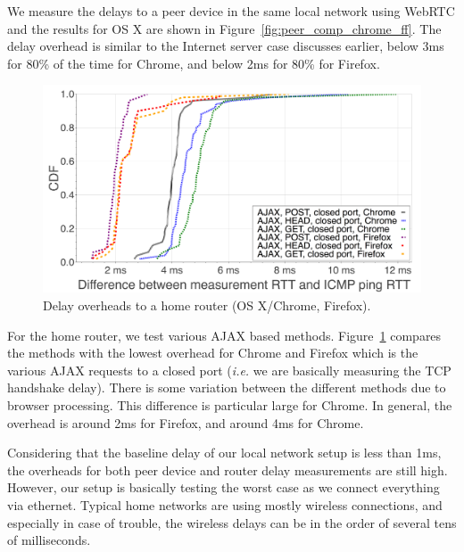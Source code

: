 \documentclass[12pt,twoside]{book}
\begin{document}
We measure the delays to a peer device in the same local network using WebRTC and the results for OS X are shown in Figure~\ref{fig:peer_comp_chrome_ff}. The delay overhead is similar to the Internet server case discusses earlier, below 3ms for 80\% of the time for Chrome, and below 2ms for 80\% for Firefox. 

\begin{figure}[thb]
\includegraphics[width=\columnwidth]{figures/router-comp-chrome-ff}
\caption{Delay overheads to a home router (OS X/Chrome, Firefox).}
\label{fig:router_comp_chrome_ff}
\end{figure}

For the home router, we test various AJAX based methods. Figure~\ref{fig:router_comp_chrome_ff} compares the methods with the lowest overhead for Chrome and Firefox which is the various AJAX requests to a closed port (\emph{i.e.} we are basically measuring the TCP handshake delay). There is some variation between the different methods due to browser processing. This difference is particular large for Chrome. In general, the overhead is around 2ms for Firefox, and around 4ms for Chrome. 

Considering that the baseline delay of our local network setup is less than 1ms, the overheads for both peer device and router delay measurements are still high. However, our setup is basically testing the worst case as we connect everything via ethernet. Typical home networks are using mostly wireless connections, and especially in case of trouble, the wireless delays can be in the order of several tens of milliseconds.
\end{document}
